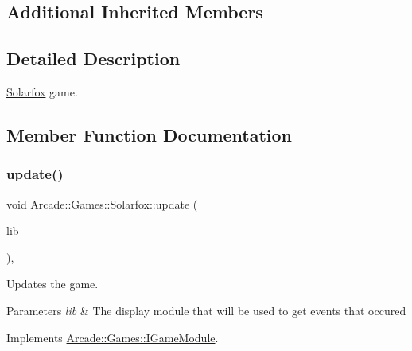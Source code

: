 \subsection*{Additional Inherited Members}


\subsection{Detailed Description}
\mbox{\hyperlink{classArcade_1_1Games_1_1Solarfox}{Solarfox}} game. 

\subsection{Member Function Documentation}
\mbox{\label{classArcade_1_1Games_1_1Solarfox_a87d7898dc7b5d8c658a18c45d35be991}} 
\subsubsection{\texorpdfstring{update()}{update()}}
{\footnotesize\ttfamily void Arcade\+::\+Games\+::\+Solarfox\+::update (\begin{DoxyParamCaption}\item[{const \mbox{\hyperlink{classArcade_1_1Display_1_1IDisplayModule}{Arcade\+::\+Display\+::\+I\+Display\+Module}} \&}]{lib }\end{DoxyParamCaption})\hspace{0.3cm}{\ttfamily [final]}, {\ttfamily [virtual]}}



Updates the game. 


\begin{DoxyParams}{Parameters}
{\em lib} & The display module that will be used to get events that occured \\
\hline
\end{DoxyParams}


Implements \mbox{\hyperlink{classArcade_1_1Games_1_1IGameModule_a421d1064fcc112dfc7ea025fc7f88aa7}{Arcade\+::\+Games\+::\+I\+Game\+Module}}.


